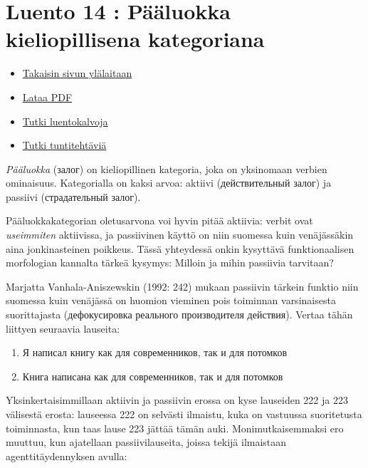 \documentclass[]{scrartcl}
\providecommand{\tightlist}{%
  \setlength{\itemsep}{0pt}\setlength{\parskip}{0pt}}
\begin{document}
\section{Luento 14 : Pääluokka kieliopillisena
kategoriana}\label{luento-14-puxe4uxe4luokka-kieliopillisena-kategoriana}

\begin{itemize}
\tightlist
\item
  \href{https://mustikka.uta.fi/~juho_harme/morfologia/\#tästä-kurssista}{Takaisin
  sivun ylälaitaan}
\item
  \href{http://mustikka.uta.fi/~juho_harme/morfologia/materiaalit/luento14.pdf}{Lataa
  PDF}
\item
  \href{http://mustikka.uta.fi/~juho_harme/morfologia/presentations/luento14.html}{Tutki
  luentokalvoja}
\item
  \href{http://mustikka.uta.fi/~juho_harme/morfologia/tehtavat/luento14.pdf}{Tutki
  tuntitehtäviä}
\end{itemize}

\emph{Pääluokka} (залог) on kieliopillinen kategoria, joka on yksinomaan
verbien ominaisuus. Kategorialla on kaksi arvoa: aktiivi (действительный
залог) ja passiivi (страдательный залог).

Pääluokkakategorian oletusarvona voi hyvin pitää aktiivia: verbit ovat
\emph{useimmiten} aktiivissa, ja passiivinen käyttö on niin suomessa
kuin venäjässäkin aina jonkinasteinen poikkeus. Tässä yhteydessä onkin
kysyttävä funktionaalisen morfologian kannalta tärkeä kysymys: Milloin
ja mihin passiivia tarvitaan?

Marjatta Vanhala-Aniszewskin (1992: 242) mukaan passiivin tärkein
funktio niin suomessa kuin venäjässä on huomion vieminen pois toiminnan
varsinaisesta suorittajasta (дефокусировка реального производителя
действия). Vertaa tähän liittyen seuraavia lauseita:

\begin{enumerate}
\def\labelenumi{(\arabic{enumi})}
\setcounter{enumi}{221}
\tightlist
\item
  Я написал книгу как для современников, так и для потомков
\item
  Книга написана как для современников, так и для потомков
\end{enumerate}

Yksinkertaisimmillaan aktiivin ja passiivin erossa on kyse lauseiden 222
ja 223 välisestä erosta: lauseessa 222 on selvästi ilmaistu, kuka on
vastuussa suoritetusta toiminnasta, kun taas lause 223 jättää tämän
auki. Monimutkaisemmaksi ero muuttuu, kun ajatellaan passiivilauseita,
joissa tekijä ilmaistaan agenttitäydennyksen avulla:
\end{document}
